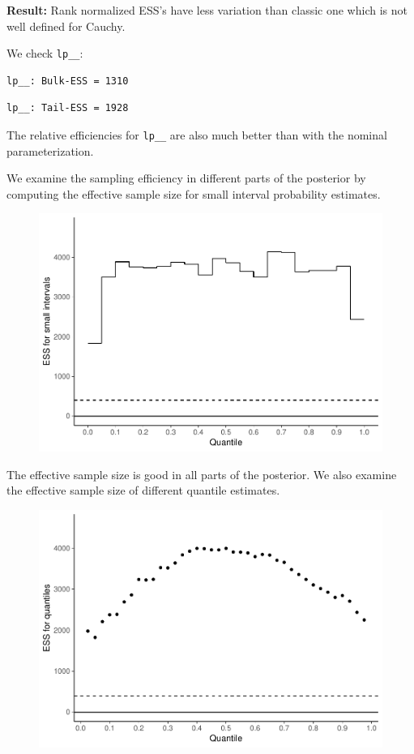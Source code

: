 \documentclass[american,]{article}
\begin{document}
\textbf{Result:} Rank normalized ESS's have less variation than classic
one which is not well defined for Cauchy.

We check \texttt{lp\_\_}:

\begin{verbatim}
lp__: Bulk-ESS = 1310
\end{verbatim}

\begin{verbatim}
lp__: Tail-ESS = 1928
\end{verbatim}

The relative efficiencies for \texttt{lp\_\_} are also much better than
with the nominal parameterization.

We examine the sampling efficiency in different parts of the posterior
by computing the effective sample size for small interval probability
estimates.

\begin{figure}[tp]
  \centering
  \includegraphics[width=0.6\linewidth]{graphics/local-ess-fit-alt1-2-1.pdf}
\end{figure}

The effective sample size is good in all parts of the posterior. We also
examine the effective sample size of different quantile estimates.

\begin{figure}[tp]
  \centering
  \includegraphics[width=0.6\linewidth]{graphics/quantile-ess-fit-alt1-2-1.pdf}
\end{figure}
\end{document}

